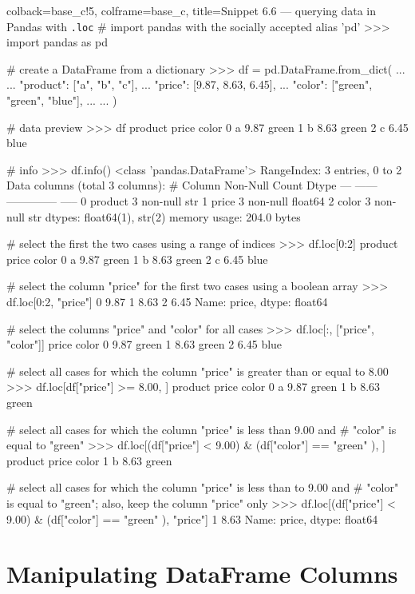 \documentclass[a4paper,11pt]{book}
\begin{document}
\begin{pythoncode}[linenos=True]{colback=base_c!5, colframe=base_c, title=\sffamily Snippet 6.6 --- querying data in Pandas with \texttt{.loc}}
# import pandas with the socially accepted alias 'pd'
>>> import pandas as pd

# create a DataFrame from a dictionary
>>> df = pd.DataFrame.from_dict(
...         {
...             "product": ["a", "b", "c"],
...             "price": [9.87, 8.63, 6.45],
...             "color": ["green", "green", "blue"],
...         }
...     )

# data preview
>>> df
  product  price  color
0       a   9.87  green
1       b   8.63  green
2       c   6.45   blue

# info
>>> df.info()
<class 'pandas.DataFrame'>
RangeIndex: 3 entries, 0 to 2
Data columns (total 3 columns):
 #   Column   Non-Null Count  Dtype  
---  ------   --------------  -----  
 0   product  3 non-null      str    
 1   price    3 non-null      float64
 2   color    3 non-null      str    
dtypes: float64(1), str(2)
memory usage: 204.0 bytes

# select the first the two cases using a range of indices
>>> df.loc[0:2]
  product  price  color
0       a   9.87  green
1       b   8.63  green
2       c   6.45   blue

# select the column "price" for the first two cases using a boolean array
>>> df.loc[0:2, "price"]
0    9.87
1    8.63
2    6.45
Name: price, dtype: float64

# select the columns "price" and "color" for all cases
>>> df.loc[:, ["price", "color"]]
   price  color
0   9.87  green
1   8.63  green
2   6.45   blue

# select all cases for which the column "price" is greater than or equal to 8.00
>>> df.loc[df["price"] >= 8.00, ]
  product  price  color
0       a   9.87  green
1       b   8.63  green

# select all cases for which the column "price" is less than 9.00 and
# "color" is equal to "green"
>>> df.loc[(df["price"] < 9.00) & (df["color"] == "green" ), ]
  product  price  color
1       b   8.63  green

# select all cases for which the column "price" is less than to 9.00 and
# "color" is equal to "green"; also, keep the column "price" only
>>> df.loc[(df["price"] < 9.00) & (df["color"] == "green" ), "price"]
1    8.63
Name: price, dtype: float64
\end{pythoncode}

\section{Manipulating DataFrame Columns}
\label{sec:manipulating_df_columns}
\end{document}
